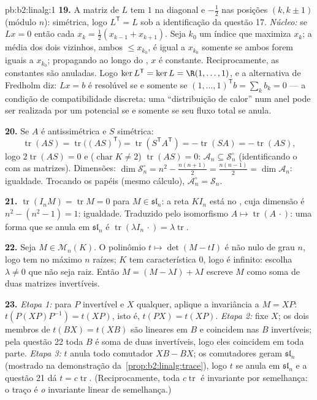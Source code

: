 \begin{solution}{pb:b2:linalg:1}
\textbf{19.} A matriz de $L$ tem $1$ na diagonal e
$-\frac12$ nas posições $(k, k\pm1)$ (módulo $n$): simétrica, logo
$L^{\mathsf T} = L$ sob a identificação da questão 17.
\emph{Núcleo:} se $Lx = 0$ então cada $x_k = \frac12(x_{k-1} +
x_{k+1})$. Seja $k_0$ um índice que maximiza $x_k$; a média dos dois
vizinhos, ambos $\leq x_{k_0}$, é igual a $x_{k_0}$ somente se ambos
forem iguais a $x_{k_0}$; propagando ao longo do , $x$ é constante.
Reciprocamente, as constantes são anuladas. Logo $\ker L^{\mathsf T} = \ker L
= \R(1, \dots, 1)$, e a alternativa de Fredholm diz: $Lx = b$ é
resolúvel se e somente se $(1,\dots,1)^{\mathsf T} b = \sum_k b_k = 0$ ---
a condição de compatibilidade discreta: uma ``distribuição de calor'' num
anel pode ser realizada por um potencial se e somente se seu fluxo total
se anula.

\textbf{20.} Se $A$ é antissimétrica e $S$ simétrica:
\[
\operatorname{tr}(AS) = \operatorname{tr}\bigl((AS)^{\mathsf
T}\bigr) = \operatorname{tr}(S^{\mathsf T}A^{\mathsf T}) =
-\operatorname{tr}(SA) = -\operatorname{tr}(AS),
\]
logo $2\operatorname{tr}(AS) = 0$ e ($\operatorname{char} K \neq
2$) $\operatorname{tr}(AS) = 0$: $\mathcal{A}_n \subseteq
\mathcal{S}_n^\circ$ (identificando o  com as matrizes).
Dimensões: $\dim\mathcal{S}_n^\circ = n^2 - \frac{n(n+1)}2 =
\frac{n(n-1)}2 = \dim\mathcal{A}_n$: igualdade. Trocando os papéis
(mesmo cálculo), $\mathcal{A}_n^\circ = \mathcal{S}_n$.

\textbf{21.} $\operatorname{tr}(I_nM) = \operatorname{tr} M = 0$
para $M \in \mathfrak{sl}_n$: a reta $KI_n$ está no
, cuja dimensão é $n^2 - (n^2 - 1) = 1$: igualdade.
Traduzido pelo isomorfismo $A \mapsto
\operatorname{tr}(A\,\cdot)$: uma forma que se anula em
$\mathfrak{sl}_n$ é $\operatorname{tr}(\lambda I_n\,\cdot) =
\lambda\operatorname{tr}$.

\textbf{22.} Seja $M \in \mathcal{M}_n(K)$. O polinômio $t
\mapsto \det(M - tI)$ é não nulo de grau $n$, logo tem no máximo
$n$ raízes; $K$ tem característica $0$, logo é infinito: escolha
$\lambda \neq 0$ que não seja raiz. Então $M = (M - \lambda I) +
\lambda I$ escreve $M$ como soma de duas matrizes invertíveis.

\textbf{23.} \emph{Etapa 1:} para $P$ invertível e $X$
qualquer, aplique a invariância a $M = XP$: $t(P(XP)P^{-1}) = t(XP)$,
isto é, $t(PX) = t(XP)$. \emph{Etapa 2:} fixe $X$; os dois membros de
$t(BX) = t(XB)$ são lineares em $B$ e coincidem nas $B$ invertíveis;
pela questão 22 toda $B$ é soma de duas invertíveis, logo eles
coincidem em toda parte. \emph{Etapa 3:} $t$ anula todo comutador $XB
- BX$; os comutadores geram $\mathfrak{sl}_n$ (mostrado na
demonstração da~\cref{prop:b2:linalg:trace}), logo $t$ se anula em
$\mathfrak{sl}_n$ e a questão 21 dá $t =
c\operatorname{tr}$. (Reciprocamente, toda $c\operatorname{tr}$ é
invariante por semelhança: o traço é \emph{o} invariante linear
de semelhança.)


\end{solution}
